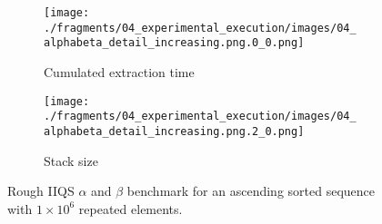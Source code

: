 \begin{figure}
    \centering
    \begin{subfigure}[b]{0.45\textwidth}
        \centering
        \texttt{[image: ./fragments/04\_experimental\_execution/images/04\_alphabeta\_detail\_increasing.png.0\_0.png]}
        \caption{Cumulated extraction time}
        \label{FIG:05_ALPHABETA_BENCHMARK_ASC__0_0}
    \end{subfigure}
    \begin{subfigure}[b]{0.45\textwidth}
        \centering
        \texttt{[image: ./fragments/04\_experimental\_execution/images/04\_alphabeta\_detail\_increasing.png.2\_0.png]}
        \caption{Stack size}
        \label{FIG:05_ALPHABETA_BENCHMARK_ASC__0_1}
    \end{subfigure}



    
    \caption{Rough IIQS $\alpha$ and $\beta$ benchmark for an ascending sorted sequence with $1\times10^6$ repeated elements.}
    \label{FIG:05_ALPHABETA_BENCHMARK_ASC}
\end{figure}



